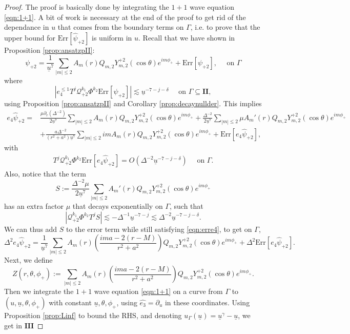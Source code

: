 \documentclass[10pt,a4paper]{amsart}
\newcommand{\Psip}{\psi_{+2}}
\newcommand{\carterp}{\mcq_{+2}}
\newcommand{\deux}{\mathbf{II}}
\newcommand{\errp}{\mathrm{Err}[\Psip]}
\newcommand{\ethat}{\widehat{e_3}}
\newcommand{\mcq}{\mathcal{Q}}
\newcommand{\psihatp}{\psihat_{+2}}
\newcommand{\psihat}{\widehat{\psi}}
\newcommand{\psip}{\psi_{+2}}
\newcommand{\sfrak}{2}
\newcommand{\trois}{\mathbf{III}}
\newcommand{\ubar}{{\underline{u}}}
\begin{document}
\begin{proof}
The proof is basically done by integrating the $1+1$ wave equation \eqref{eqn:1+1}. A bit of work is necessary at the end of the proof to get rid of the dependance in $u$ that comes from the boundary terms on $\Gamma$, i.e. to prove that the upper bound for $\mathrm{Err}[\psihatp]$ is uniform in $u$. Recall that we have shown in Proposition \ref{prop:ansatzpII}:
$$\psip=\frac{1}{\ubar^{7}}\sum_{|m|\leq2}A_m(r)Q_{m,\sfrak}Y_{m,\sfrak}^{+\sfrak}(\cos\theta)e^{im\phi_{+}}+\errp,\quad\text{   on   }\Gamma$$
where $$|e_4^{\leq 1}T^j\carterp^{k_1}\Phi^{k_2}\errp|\lesssim\ubar^{-7-j-\delta}\quad\text{  on  }\Gamma\subseteq\deux,$$
using Proposition \ref{prop:ansatzpII} and Corollary \ref{prop:decaynullder}. This implies 
\begin{align}
    e_4\psihatp=&\frac{\mu\partial_r(\Delta^{-2})}{2\ubar^7}\sum_{|m|\leq2}A_m(r)Q_{m,\sfrak}Y_{m,\sfrak}^{+\sfrak}(\cos\theta)e^{im\phi_{+}}+\frac{\Delta^{-2}}{2\ubar^7}\sum_{|m|\leq2}\mu A_m'(r)Q_{m,\sfrak}Y_{m,\sfrak}^{+\sfrak}(\cos\theta)e^{im\phi_{+}}\nonumber\\
    &+\frac{a\Delta^{-2}}{(r^2+a^2)\ubar^7}\sum_{|m|\leq2}imA_m(r)Q_{m,\sfrak}Y_{m,\sfrak}^{+\sfrak}(\cos\theta)e^{im\phi_{+}}+{\mathrm{Err}[e_4\psihatp]},\label{eqn:cpf}
\end{align}
with 
\begin{align}\label{eqn:erre4}
    T^j\carterp^{k_1}\Phi^{k_2}{\mathrm{Err}[e_4\psihatp]}=O(\Delta^{-2}\ubar^{-7-j-\delta})\quad\text{   on   }\Gamma.
\end{align}
Also, notice that the term 
$$S:=\frac{\Delta^{-2}\mu}{2\ubar^7}\sum_{|m|\leq2} A_m'(r)Q_{m,\sfrak}Y_{m,\sfrak}^{+\sfrak}(\cos\theta)e^{im\phi_{+}}$$
has an extra factor $\mu$ that decays exponentially on $\Gamma$, such that $$|\carterp^{k_1}\Phi^{k_2}T^jS|\lesssim-\Delta^{-1}\ubar^{-7-j}\lesssim \Delta^{-2}\ubar^{-7-j-\delta}.$$
We can thus add $S$ to the error term while still satisfying \eqref{eqn:erre4}, to get on $\Gamma$,
$$\Delta^2e_4\psihatp=\frac{1}{\ubar^7}\sum_{|m|\leq2}A_m(r)\left(\frac{ima-2(r-M)}{r^2+a^2}\right)Q_{m,\sfrak}Y_{m,\sfrak}^{+\sfrak}(\cos\theta)e^{im\phi_{+}}+\Delta^{2}{\mathrm{Err}[e_4\psihatp]}.$$
Next, we define 
$$Z(r,\theta,\phi_{+}):=\sum_{|m|\leq2}A_m(r)\left(\frac{ima-2(r-M)}{r^2+a^2}\right)Q_{m,\sfrak}Y_{m,\sfrak}^{+\sfrak}(\cos\theta)e^{im\phi_{+}}.$$
Then we integrate the $1+1$ wave equation \eqref{eqn:1+1} on a curve from $\Gamma$ to $(u,\ubar,\theta,\phi_{+})$ with  constant $\ubar,\theta,\phi_{+}$, using $\ethat=\partial_u$ in these coordinates. Using Proposition \ref{prop:Linf} to bound the RHS, and denoting $u_\Gamma(\ubar)=\ubar^\gamma-\ubar$, we get in $\trois$

\end{proof}
\end{document}
